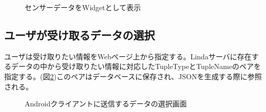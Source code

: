 \begin{figure}[htbp]
  \begin{minipage}{\hsize}
    \begin{center}
    \end{center}
    \caption{センサーデータをWidgetとして表示}
    \label{fig:sensor_widget}
  \end{minipage}
\end{figure}

\subsection{ユーザが受け取るデータの選択}

ユーザは受け取りたい情報をWebページ上から指定する。Lindaサーバに存在するデータの中から受け取りたい情報に対応したTupleTypeとTupleNameのペアを指定する。(図\ref{fig:select})このペアはデータベースに保存され、JSONを生成する際に参照される。

\begin{figure}[htbp]
  \begin{minipage}{\hsize}
    \begin{center}
    \end{center}
    \caption{Androidクライアントに送信するデータの選択画面}
    \label{fig:select}
  \end{minipage}
\end{figure}

